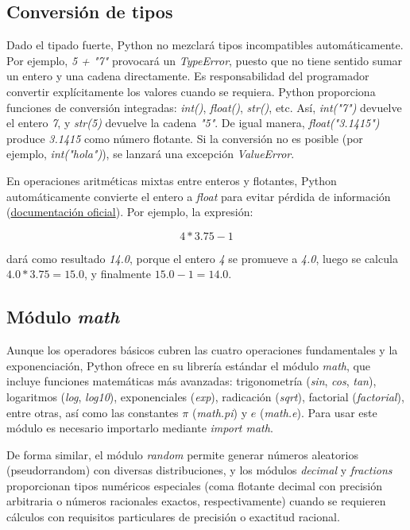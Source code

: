 \subsection*{Conversión de tipos}
Dado el tipado fuerte, Python no mezclará tipos incompatibles automáticamente. 
Por ejemplo, \textit{5 + "7"} provocará un \textit{TypeError}, puesto que no tiene sentido 
sumar un entero y una cadena directamente. 
Es responsabilidad del programador convertir explícitamente los valores cuando se requiera. 
Python proporciona funciones de conversión integradas: \textit{int()}, \textit{float()}, \textit{str()}, etc. 
Así, \textit{int("7")} devuelve el entero \textit{7}, y \textit{str(5)} devuelve la cadena \textit{"5"}. 
De igual manera, \textit{float("3.1415")} produce \textit{3.1415} como número flotante. 
Si la conversión no es posible (por ejemplo, \textit{int("hola")}), se lanzará una excepción \textit{ValueError}. 

En operaciones aritméticas mixtas entre enteros y flotantes, 
Python automáticamente convierte el entero a \textit{float} para evitar pérdida de información 
(\href{https://docs.python.org/3/library/functions.html}{documentación oficial}). 
Por ejemplo, la expresión:

\[
4 * 3.75 - 1
\]

dará como resultado \textit{14.0}, porque el entero \textit{4} se promueve a \textit{4.0}, 
luego se calcula $4.0 * 3.75 = 15.0$, y finalmente $15.0 - 1 = 14.0$.

\subsection*{Módulo \textit{math}}
Aunque los operadores básicos cubren las cuatro operaciones fundamentales y la exponenciación, 
Python ofrece en su librería estándar el módulo \textit{math}, que incluye funciones matemáticas más avanzadas: 
trigonometría (\textit{sin}, \textit{cos}, \textit{tan}), logaritmos (\textit{log}, \textit{log10}), 
exponenciales (\textit{exp}), radicación (\textit{sqrt}), factorial (\textit{factorial}), entre otras, 
así como las constantes $\pi$ (\textit{math.pi}) y $e$ (\textit{math.e}). 
Para usar este módulo es necesario importarlo mediante \textit{import math}. 

De forma similar, el módulo \textit{random} permite generar números aleatorios 
(pseudorrandom) con diversas distribuciones, y los módulos \textit{decimal} y \textit{fractions} 
proporcionan tipos numéricos especiales (coma flotante decimal con precisión arbitraria o números racionales exactos, respectivamente) 
cuando se requieren cálculos con requisitos particulares de precisión o exactitud racional.

